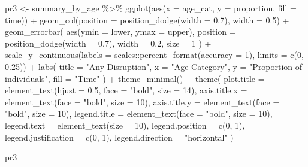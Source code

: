 \documentclass[
  letterpaper,
  DIV=11,
  numbers=noendperiod]{scrartcl}
\newenvironment{Shaded}{\begin{snugshade}}{\end{snugshade}}
\newcommand{\AttributeTok}[1]{\textcolor[rgb]{0.40,0.45,0.13}{#1}}
\newcommand{\DecValTok}[1]{\textcolor[rgb]{0.68,0.00,0.00}{#1}}
\newcommand{\FloatTok}[1]{\textcolor[rgb]{0.68,0.00,0.00}{#1}}
\newcommand{\FunctionTok}[1]{\textcolor[rgb]{0.28,0.35,0.67}{#1}}
\newcommand{\NormalTok}[1]{\textcolor[rgb]{0.00,0.23,0.31}{#1}}
\newcommand{\OtherTok}[1]{\textcolor[rgb]{0.00,0.23,0.31}{#1}}
\newcommand{\SpecialCharTok}[1]{\textcolor[rgb]{0.37,0.37,0.37}{#1}}
\newcommand{\StringTok}[1]{\textcolor[rgb]{0.13,0.47,0.30}{#1}}
\begin{document}
\begin{Shaded}
\begin{Highlighting}[]
\NormalTok{pr3 }\OtherTok{\textless{}{-}}\NormalTok{ summary\_by\_age }\SpecialCharTok{\%\textgreater{}\%} 
\FunctionTok{ggplot}\NormalTok{(}\FunctionTok{aes}\NormalTok{(}\AttributeTok{x =}\NormalTok{ age\_cat, }\AttributeTok{y =}\NormalTok{ proportion, }\AttributeTok{fill =}\NormalTok{ time)) }\SpecialCharTok{+}
  \FunctionTok{geom\_col}\NormalTok{(}\AttributeTok{position =} \FunctionTok{position\_dodge}\NormalTok{(}\AttributeTok{width =} \FloatTok{0.7}\NormalTok{), }\AttributeTok{width =} \FloatTok{0.5}\NormalTok{) }\SpecialCharTok{+}
  \FunctionTok{geom\_errorbar}\NormalTok{(}
    \FunctionTok{aes}\NormalTok{(}\AttributeTok{ymin =}\NormalTok{ lower, }\AttributeTok{ymax =}\NormalTok{ upper),}
    \AttributeTok{position =} \FunctionTok{position\_dodge}\NormalTok{(}\AttributeTok{width =} \FloatTok{0.7}\NormalTok{),}
    \AttributeTok{width =} \FloatTok{0.2}\NormalTok{,}
    \AttributeTok{size =} \DecValTok{1}
\NormalTok{  ) }\SpecialCharTok{+}
  \FunctionTok{scale\_y\_continuous}\NormalTok{(}\AttributeTok{labels =}\NormalTok{ scales}\SpecialCharTok{::}\FunctionTok{percent\_format}\NormalTok{(}\AttributeTok{accuracy =} \DecValTok{1}\NormalTok{), }\AttributeTok{limits =} \FunctionTok{c}\NormalTok{(}\DecValTok{0}\NormalTok{, }\FloatTok{0.25}\NormalTok{)) }\SpecialCharTok{+}
  \FunctionTok{labs}\NormalTok{(}
    \AttributeTok{title =} \StringTok{"Any Disruption"}\NormalTok{,}
    \AttributeTok{x =} \StringTok{"Age Category"}\NormalTok{,}
    \AttributeTok{y =} \StringTok{"Proportion of individuals"}\NormalTok{,}
    \AttributeTok{fill =} \StringTok{"Time"}
\NormalTok{  ) }\SpecialCharTok{+}
  \FunctionTok{theme\_minimal}\NormalTok{() }\SpecialCharTok{+}
  \FunctionTok{theme}\NormalTok{(}
    \AttributeTok{plot.title =} \FunctionTok{element\_text}\NormalTok{(}\AttributeTok{hjust =} \FloatTok{0.5}\NormalTok{, }\AttributeTok{face =} \StringTok{"bold"}\NormalTok{, }\AttributeTok{size =} \DecValTok{14}\NormalTok{),}
    \AttributeTok{axis.title.x =} \FunctionTok{element\_text}\NormalTok{(}\AttributeTok{face =} \StringTok{"bold"}\NormalTok{, }\AttributeTok{size =} \DecValTok{10}\NormalTok{),}
    \AttributeTok{axis.title.y =} \FunctionTok{element\_text}\NormalTok{(}\AttributeTok{face =} \StringTok{"bold"}\NormalTok{, }\AttributeTok{size =} \DecValTok{10}\NormalTok{),}
    \AttributeTok{legend.title =} \FunctionTok{element\_text}\NormalTok{(}\AttributeTok{face =} \StringTok{"bold"}\NormalTok{, }\AttributeTok{size =} \DecValTok{10}\NormalTok{),}
    \AttributeTok{legend.text =} \FunctionTok{element\_text}\NormalTok{(}\AttributeTok{size =} \DecValTok{10}\NormalTok{),}
    \AttributeTok{legend.position =} \FunctionTok{c}\NormalTok{(}\DecValTok{0}\NormalTok{, }\DecValTok{1}\NormalTok{), }
    \AttributeTok{legend.justification =} \FunctionTok{c}\NormalTok{(}\DecValTok{0}\NormalTok{, }\DecValTok{1}\NormalTok{),}
    \AttributeTok{legend.direction =} \StringTok{"horizontal"}
\NormalTok{  )}

\NormalTok{pr3}
\end{Highlighting}
\end{Shaded}
\end{document}
